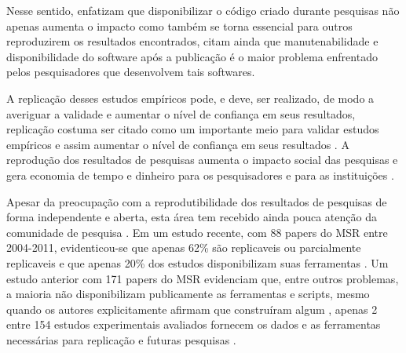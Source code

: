 %
%


Nesse sentido,  enfatizam que disponibilizar o código
criado durante pesquisas não apenas aumenta o impacto como também se torna
essencial para outros reproduzirem os resultados encontrados, citam ainda que
manutenabilidade e disponibilidade do software após a publicação é o maior
problema enfrentado pelos pesquisadores que desenvolvem tais softwares.

A replicação desses estudos empíricos pode, e deve, ser realizado, de modo a
averiguar a validade e aumentar o nível de confiança em seus resultados,
replicação costuma ser citado como um importante meio para validar estudos
empíricos e assim aumentar o nível de confiança em seus resultados
\cite{Almqvist2006}. A reprodução dos resultados de pesquisas aumenta o impacto
social das pesquisas e gera economia de tempo e dinheiro para os pesquisadores
e para as instituições \cite{Nesta2010}.

Apesar da preocupação com a reprodutibilidade dos resultados de pesquisas de
forma independente \cite{Stodden2009} e aberta, esta área tem recebido ainda
pouca atenção da comunidade de pesquisa \cite{Nancy2015, Grand2010Open}. Em um
estudo recente, com 88 papers do MSR entre 2004-2011, evidenticou-se que apenas
62\% são replicaveis ou parcialmente replicaveis e que apenas 20\% dos estudos
disponibilizam suas ferramentas \cite{amann2015software}. Um estudo anterior
com 171 papers do MSR evidenciam que, entre outros problemas, a maioria não
disponibilizam publicamente as ferramentas e scripts, mesmo quando os autores
explicitamente afirmam que construíram algum \cite{robles2010replicating},
apenas 2 entre 154 estudos experimentais avaliados fornecem os dados e as
ferramentas necessárias para replicação e futuras pesquisas
\cite{barr2010shoulders}.

